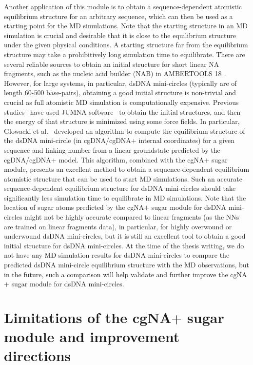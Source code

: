 Another application of this module is to obtain a sequence-dependent atomistic equilibrium structure for an arbitrary sequence, which can then be used as a starting point for the MD simulations. 
Note that the starting structure in an MD simulation is crucial and desirable that it is close to the equilibrium structure under the given physical conditions.
A starting structure far from the equilibrium structure may take a prohibitively long simulation time to equilibrate.
There are several reliable sources to obtain an initial structure for short linear NA fragments, such as the nucleic acid builder (NAB) in AMBERTOOLS 18~\cite{amber}.
However, for large systems, in particular, dsDNA mini-circles (typically are of length 60-500 base-pairs), obtaining a good initial structure is non-trivial and crucial as full atomistic MD simulation is computationally expensive.
Previous studies~\cite{lankavs2006kinking} have used JUMNA software~\cite{lavery1995jumna} to obtain the initial structures, and then the energy of that structure is minimized using some force fields.
In particular, Glowacki et al.~\cite{glowackithesis,beaud2021using} developed an algorithm to compute the equilibrium structure of the dsDNA mini-circle (in cgDNA/cgDNA$+$ internal coordinates) for a given sequence and linking number from a linear groundstate predicted by the cgDNA/cgDNA$+$ model.
This algorithm, combined with the cgNA$+$ sugar module, presents an excellent method to obtain a sequence-dependent equilibrium atomistic structure that can be used to start MD simulations.
Such an accurate sequence-dependent equilibrium structure for dsDNA mini-circles should take significantly less simulation time to equilibrate in MD simulations.
Note that the location of sugar atoms predicted by the cgNA$+$ sugar module for dsDNA mini-circles might not be highly accurate compared to linear fragments (as the NNs are trained on linear fragments data), in particular, for highly overwound or underwound dsDNA mini-circles, but it is still an excellent tool to obtain a good initial structure for dsDNA mini-circles.
At the time of the thesis writing, we do not have any MD simulation results for dsDNA mini-circles to compare the predicted dsDNA mini-circle equilibrium structure with the MD observations, but in the future, such a comparison will help validate and further improve the cgNA$+$ sugar module for dsDNA mini-circles.

\section{Limitations of the cgNA$+$ sugar module and  improvement directions}

